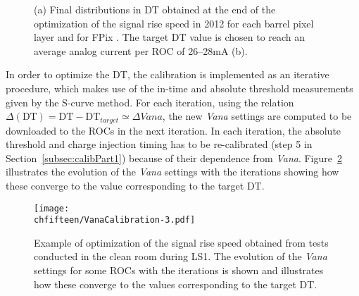 
\begin{figure}[!htb]
 \begin{center}
 \end{center}
 \caption{(a) Final distributions in DT obtained at the end of the optimization of the signal rise speed in 2012 for each barrel pixel layer and for FPix . The target DT value is chosen to reach an average analog current per ROC of 26--28\unit{mA} (b).}
 \label{fig:VanaCalib2012}
\end{figure}

In order to optimize the DT, the calibration is implemented as an iterative procedure, which makes use of the in-time and absolute threshold measurements given by the S-curve method.
For each iteration, using the relation $\Delta(\mathrm{DT}) = \mathrm{DT} - \mathrm{DT}_{target} \simeq \Delta{Vana}$, the new \textit{Vana} settings are computed to be downloaded to the ROCs in the next iteration.
In each iteration, the absolute threshold and charge injection timing has to be re-calibrated (step 5 in Section~\ref{subsec:calibPart1}) because of their dependence from \textit{Vana}. 
Figure~\ref{fig:VanaCalib} illustrates the evolution of the \textit{Vana} settings with the iterations showing how these converge to the value corresponding to the target DT.

\begin{figure}[!htb]
\begin{center}
 \texttt{[image: \\chfifteen/VanaCalibration-3.pdf]}
 \end{center}
 \caption{Example of optimization of the signal rise speed obtained from tests conducted in the clean room during LS1. The evolution of the \textit{Vana} settings for some ROCs with the iterations is shown and illustrates how these converge to the values corresponding to the target DT. }
 \label{fig:VanaCalib}
\end{figure}

